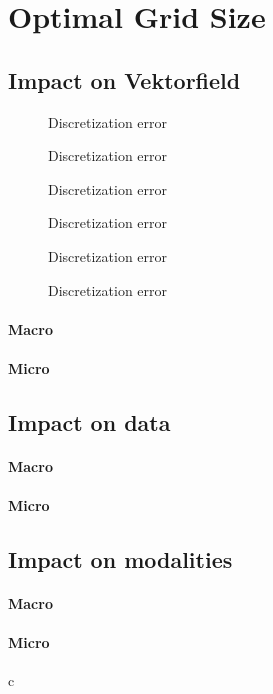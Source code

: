 \section{Optimal Grid Size}
\subsection{Impact on Vektorfield}
% 
\begin{figure}[!tb]
\centering
{}
\caption{Discretization error}
\label{fig:vectorfield_disc}
\end{figure}
% 
\begin{figure}[!tb]
\centering
{}
\caption{Discretization error}
\label{fig:vectorfield_disc}
\end{figure}
% 
\begin{figure}[!tb]
\centering
{}
\caption{Discretization error}
\label{fig:vectorfield_disc}
\end{figure}
% 
\begin{figure}[!tb]
\centering
{}
\caption{Discretization error}
\label{fig:vectorfield_disc}
\end{figure}
% 
\begin{figure}[!tb]
\centering
{}
\caption{Discretization error}
\label{fig:vectorfield_disc}
\end{figure}
% 
\begin{figure}[!tb]
\centering
{}
\caption{Discretization error}
\label{fig:vectorfield_disc}
\end{figure}
% 
\paragraph{Macro}
\paragraph{Micro}
% 
\subsection{Impact on data}
\paragraph{Macro}
\paragraph{Micro}
% 
\subsection{Impact on modalities}
\paragraph{Macro}
\paragraph{Micro}

c